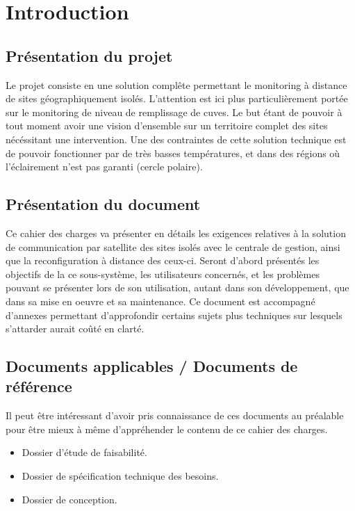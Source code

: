 \section{Introduction}

\subsection{Présentation du projet}

Le projet consiste en une solution complête permettant le monitoring à distance de sites géographiquement isolés. L'attention est ici plus particulièrement portée sur le monitoring de niveau de remplissage de cuves. Le but étant de pouvoir à tout moment avoir une vision d'ensemble sur un territoire complet des sites nécéssitant une intervention. Une des contraintes de cette solution technique est de pouvoir fonctionner par de très basses températures, et dans des régions où l'éclairement n'est pas garanti (cercle polaire).

\subsection{Présentation du document}

Ce cahier des charges va présenter en détails les exigences relatives à la solution de communication par satellite des sites isolés avec le centrale de gestion, ainsi que la reconfiguration à distance des ceux-ci. Seront d'abord présentés les objectifs de la ce sous-système, les utilisateurs concernés, et les problèmes pouvant se présenter lors de son utilisation, autant dans son développement, que dans sa mise en oeuvre et sa maintenance. Ce document est accompagné d'annexes permettant d'approfondir certains sujets plus techniques sur lesquels s'attarder aurait coûté en clarté.

\subsection{Documents applicables / Documents de référence}

Il peut être intéressant d'avoir pris connaissance de ces documents au préalable pour être mieux à même d'appréhender le contenu de ce cahier des charges.

\begin{itemize}
\item Dossier d'étude de faisabilité.
\item Dossier de spécification technique des besoins.
\item Dossier de conception.
\end{itemize}

